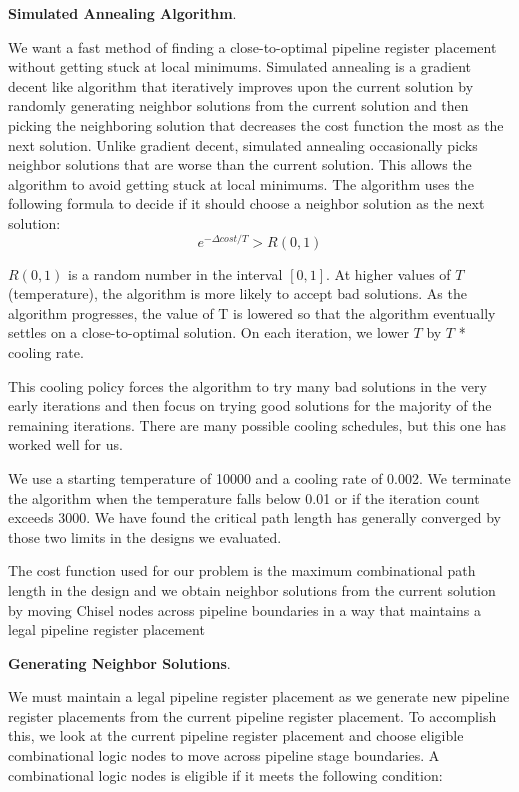 {\bf Simulated Annealing Algorithm}.

We want a fast method of finding a close-to-optimal pipeline register placement without getting stuck at local minimums. Simulated annealing is a gradient decent like algorithm that iteratively improves upon the current solution by randomly generating neighbor solutions from the current solution and then picking the neighboring solution that decreases the cost function the most as the next solution. Unlike gradient decent, simulated annealing occasionally picks neighbor solutions that are worse than the current solution. This allows the algorithm to avoid getting stuck at local minimums. The algorithm uses the following formula to decide if it should choose a neighbor solution as the next solution:
$$
e^{-\Delta cost/T} > R(0,1)
$$


$R(0,1)$ is a random number in the interval $[0, 1]$. At higher values of $T$ (temperature), the algorithm is more likely to accept bad solutions. As the algorithm progresses, the value of T is lowered so that the algorithm eventually settles on a close-to-optimal solution. On each iteration, we lower $T$ by $T$ * cooling rate.


This cooling policy forces the algorithm to try many bad solutions in the very early iterations and then focus on trying good solutions for the majority of the remaining iterations. There are many possible cooling schedules, but this one has worked well for us.

We use a starting temperature of 10000 and a cooling rate of 0.002. We terminate the algorithm when the temperature falls below 0.01 or if the iteration count exceeds 3000. We have found the critical path length has generally converged by those two limits in the designs we evaluated.

The cost function used for our problem is the maximum combinational path length in the design and we obtain neighbor solutions from the current solution by moving Chisel nodes across pipeline boundaries in a way that maintains a legal pipeline register placement


{\bf Generating Neighbor Solutions}.

We must maintain a legal pipeline register placement as we generate new pipeline register placements from the current pipeline register placement. To accomplish this, we look at the current pipeline register placement and choose eligible combinational logic nodes to move across pipeline stage boundaries. A combinational logic nodes is eligible if it meets the following condition:

